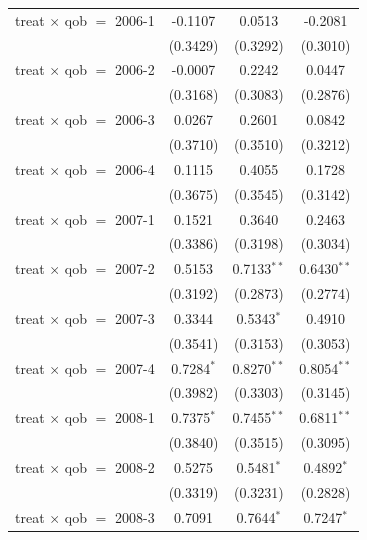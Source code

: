 \begin{table}[htbp]
\begin{tabular}{lccc}
      treat $\times$ qob $=$ 2006-1  & -0.1107       & 0.0513         & -0.2081\\   
                                     & (0.3429)      & (0.3292)       & (0.3010)\\   
      treat $\times$ qob $=$ 2006-2  & -0.0007       & 0.2242         & 0.0447\\   
                                     & (0.3168)      & (0.3083)       & (0.2876)\\   
      treat $\times$ qob $=$ 2006-3  & 0.0267        & 0.2601         & 0.0842\\   
                                     & (0.3710)      & (0.3510)       & (0.3212)\\   
      treat $\times$ qob $=$ 2006-4  & 0.1115        & 0.4055         & 0.1728\\   
                                     & (0.3675)      & (0.3545)       & (0.3142)\\   
      treat $\times$ qob $=$ 2007-1  & 0.1521        & 0.3640         & 0.2463\\   
                                     & (0.3386)      & (0.3198)       & (0.3034)\\   
      treat $\times$ qob $=$ 2007-2  & 0.5153        & 0.7133$^{**}$  & 0.6430$^{**}$\\   
                                     & (0.3192)      & (0.2873)       & (0.2774)\\   
      treat $\times$ qob $=$ 2007-3  & 0.3344        & 0.5343$^{*}$   & 0.4910\\   
                                     & (0.3541)      & (0.3153)       & (0.3053)\\   
      treat $\times$ qob $=$ 2007-4  & 0.7284$^{*}$  & 0.8270$^{**}$  & 0.8054$^{**}$\\   
                                     & (0.3982)      & (0.3303)       & (0.3145)\\   
      treat $\times$ qob $=$ 2008-1  & 0.7375$^{*}$  & 0.7455$^{**}$  & 0.6811$^{**}$\\   
                                     & (0.3840)      & (0.3515)       & (0.3095)\\   
      treat $\times$ qob $=$ 2008-2  & 0.5275        & 0.5481$^{*}$   & 0.4892$^{*}$\\   
                                     & (0.3319)      & (0.3231)       & (0.2828)\\   
      treat $\times$ qob $=$ 2008-3  & 0.7091        & 0.7644$^{*}$   & 0.7247$^{*}$\\   

\end{tabular}
\end{table}
